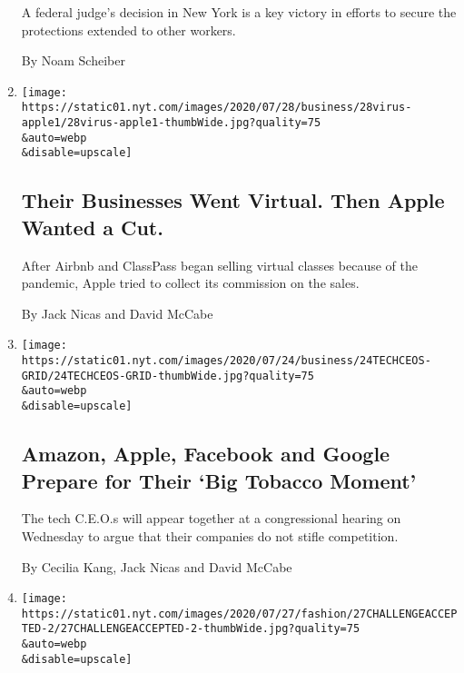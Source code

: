 \begin{enumerate}
  A federal judge's decision in New York is a key victory in efforts to
  secure the protections extended to other workers.

  By Noam Scheiber
\item
  \href{/2020/07/28/technology/apple-app-store-airbnb-classpass.html}{}

  \texttt{[image: https://static01.nyt.com/images/2020/07/28/business/28virus-apple1/28virus-apple1-thumbWide.jpg?quality=75\\\&auto=webp\\\&disable=upscale]}

  \hypertarget{their-businesses-went-virtual-then-apple-wanted-a-cut}{%
  \subsection{Their Businesses Went Virtual. Then Apple Wanted a
  Cut.}\label{their-businesses-went-virtual-then-apple-wanted-a-cut}}

  After Airbnb and ClassPass began selling virtual classes because of
  the pandemic, Apple tried to collect its commission on the sales.

  By Jack Nicas and David McCabe
\item
  \href{/2020/07/28/technology/amazon-apple-facebook-google-antitrust-hearing.html}{}

  \texttt{[image: https://static01.nyt.com/images/2020/07/24/business/24TECHCEOS-GRID/24TECHCEOS-GRID-thumbWide.jpg?quality=75\\\&auto=webp\\\&disable=upscale]}

  \hypertarget{amazon-apple-facebook-and-google-prepare-for-their-big-tobacco-moment}{%
  \subsection{Amazon, Apple, Facebook and Google Prepare for Their `Big
  Tobacco
  Moment'}\label{amazon-apple-facebook-and-google-prepare-for-their-big-tobacco-moment}}

  The tech C.E.O.s will appear together at a congressional hearing on
  Wednesday to argue that their companies do not stifle competition.

  By Cecilia Kang, Jack Nicas and David McCabe
\item
  \href{/2020/07/27/style/challenge-accepted-instagram.html}{}

  \texttt{[image: https://static01.nyt.com/images/2020/07/27/fashion/27CHALLENGEACCEPTED-2/27CHALLENGEACCEPTED-2-thumbWide.jpg?quality=75\\\&auto=webp\\\&disable=upscale]}

  \hypertarget{challenge-accepted-why-women-are-posting-black-and-white-selfies}{%
}
\end{enumerate}
